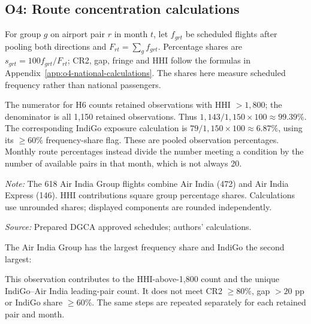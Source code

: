 \documentclass[12pt,a4paper]{article}
\begin{document}
\clearpage
\subsection{O4: Route concentration calculations}
\label{app:o4-route-calculations}
For group $g$ on airport pair $r$ in month $t$, let $f_{grt}$ be scheduled flights after pooling both directions and $F_{rt}=\sum_g f_{grt}$. Percentage shares are $s_{grt}=100f_{grt}/F_{rt}$; CR2, gap, fringe and HHI follow the formulas in Appendix~\ref{app:o4-national-calculations}. The shares here measure scheduled frequency rather than national passengers.

The numerator for H6 counts retained observations with HHI $>1{,}800$; the denominator is all 1,150 retained observations. Thus $1{,}143/1{,}150\times100\approx99.39\%$. The corresponding IndiGo exposure calculation is $79/1{,}150\times100\approx6.87\%$, using its $\geq60\%$ frequency-share flag. These are pooled observation percentages. Monthly route percentages instead divide the number meeting a condition by the number of available pairs in that month, which is not always 20.

\begin{minipage}{\linewidth}
\captionsetup{font=small,labelfont=bf,justification=raggedright,singlelinecheck=false,hypcap=false}
\label{tab:o4-route-worked}
\centering
{\small{}\par}
\vspace{4pt}
{\footnotesize{}\raggedright\textit{Note:} The 618 Air India Group flights combine Air India (472) and Air India Express (146). HHI contributions square group percentage shares. Calculations use unrounded shares; displayed components are rounded independently.\par
\textit{Source:} Prepared DGCA approved schedules; authors' calculations.\par}
\end{minipage}

The Air India Group has the largest frequency share and IndiGo the second largest:

This observation contributes to the HHI-above-1,800 count and the unique IndiGo--Air India leading-pair count. It does not meet CR2 $\geq80\%$, gap $>20$ pp or IndiGo share $\geq60\%$. The same steps are repeated separately for each retained pair and month.

\clearpage
\end{document}
